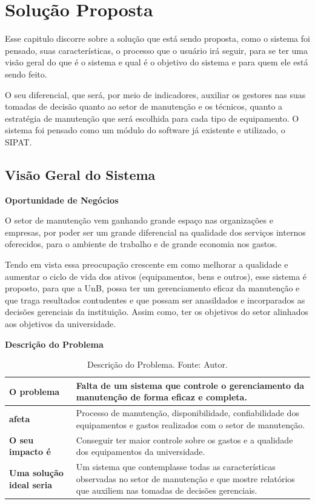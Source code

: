 \chapter{Solução Proposta}

Esse capitulo discorre sobre a solução que está sendo proposta, como o sistema foi pensado, suas características, o processo que o usuário irá seguir, para se ter uma visão geral do que é o sistema e qual é o objetivo do sistema e para quem ele está sendo feito. 

O seu diferencial, que será, por meio de indicadores, auxiliar os gestores nas suas tomadas de decisão quanto ao setor de manutenção e os técnicos, quanto a estratégia de manutenção que será escolhida para cada tipo de equipamento. O sistema foi pensado como um módulo do software já existente e utilizado, o SIPAT.


\section{Visão Geral do Sistema}

\textbf{Oportunidade de Negócios}

O setor de manutenção vem ganhando grande espaço nas organizações e empresas, por poder ser um grande diferencial na qualidade dos serviços internos oferecidos, para o ambiente de trabalho e de grande economia nos gastos. 

Tendo em vista essa preocupação crescente em como melhorar a qualidade e aumentar o ciclo de vida dos ativos (equipamentos, bens e outros), esse sistema é proposto, para que a UnB, possa ter um gerenciamento eficaz da manutenção e que traga resultados contudentes e que possam ser anasildados e incorparados as decisões gerenciais da instituição. Assim como, ter os objetivos do setor alinhados aos objetivos da universidade.

\textbf{Descrição do Problema}

\begin{table}[H]
\centering
\caption{Descrição do Problema. Fonte: Autor.}
\label{tab-problema}
\begin{tabular}{ | p{5cm} | p{10cm} | }
\hline
	\textbf{O problema} & Falta de um sistema que controle o gerenciamento da manutenção de forma eficaz e completa.  \\ \hline
	\textbf{afeta} & Processo de manutenção, disponibilidade, confiabilidade dos equipamentos e gastos realizados com o setor de manutenção. \\ \hline
	\textbf{O seu impacto é} & Conseguir ter maior controle sobre os gastos e a qualidade dos equipamentos da universidade. \\ \hline
	\textbf{Uma solução ideal seria} & Um sistema que contemplasse todas as características observadas no setor de manutenção e que mostre relatórios que auxiliem nas tomadas de decisões gerenciais. \\ \hline
\end{tabular}
\end{table}

